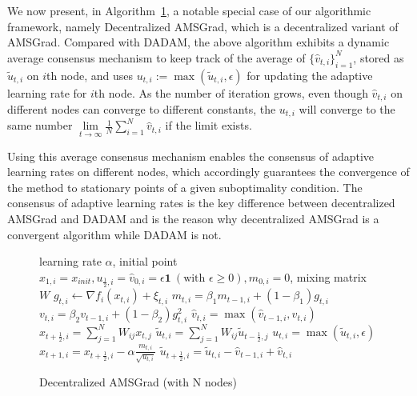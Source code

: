 \documentclass{article} %
\begin{document}
We now present, in Algorithm~\ref{alg: damsgrad}, a notable special case of our algorithmic framework, namely Decentralized AMSGrad, which is a decentralized variant of AMSGrad.
Compared with DADAM, the above algorithm exhibits a dynamic average consensus mechanism to keep track of the average of $\{\hat v_{t,i}\}_{i=1}^N$, stored as $\tilde u_{t,i}$ on $i$th node, and uses $u_{t,i} := \max(\tilde u_{t,i}, \epsilon)$ for updating the adaptive learning rate for $i$th node. 
As the number of iteration grows, even though $\hat v_{t,i}$ on different nodes can converge to different constants, the $u_{t,i}$ will converge to the same number $ \lim \limits_{t \rightarrow \infty} \frac{1}{N} \sum_{i=1}^N\hat v_{t,i} $ if the limit exists.

Using this average consensus mechanism enables the consensus of adaptive learning rates on different nodes, which accordingly guarantees the convergence of the method to stationary points of a given suboptimality condition. 
The consensus of adaptive learning rates is the key difference between decentralized AMSGrad and DADAM and is the reason why decentralized AMSGrad is a convergent algorithm while DADAM is not.\begin{figure}\vspace{-0.15in}
\begin{minipage}{\linewidth}
\begin{algorithm}[H]
	\caption{Decentralized AMSGrad (with N nodes)}
	\label{alg: damsgrad}
	\begin{algorithmic}[1]
		 learning rate $\alpha$, initial point $x_{1,i} = x_{init}, u_{\frac{1}{2},i} = \hat v_{0,i} = \epsilon \mathbf 1\ (\text{with } \epsilon \geq 0), m_{0,i}=0$, mixing matrix $W$ 
		\STATE  $g_{t,i}  \leftarrow \nabla f_i(x_{t,i}) + \xi_{t,i}$
		\STATE $m_{t,i} = \beta_1 m_{t-1,i} + (1-\beta_1) g_{t,i}$ 
		\STATE $ v_{t,i} = \beta_2 v_{t-1,i} + (1-\beta_2) g_{t,i}^2 $
		\STATE $\hat v_{t,i} = \max (\hat v_{t-1,i}, v_{t,i} )$
		\STATE $x_{t+\frac{1}{2},i} = \sum_{j=1}^N W_{ij}x_{t,j}$
		\STATE $\tilde u_{t,i} = \sum_{j=1}^N W_{ij}\tilde u_{t-\frac{1}{2},j}$
	    \STATE $u_{t,i} = \max(\tilde u_{t,i}, \epsilon)$
		\STATE $x_{t+1,i} = x_{t+\frac{1}{2},i} - \alpha \frac{m_{t,i}}{\sqrt{u_{t,i}}}$
		\STATE $\tilde u_{t+\frac{1}{2},i} = \tilde u_{t,i} - \hat v_{t-1,i} + \hat v_{t,i}$
		\ENDFAP
		\ENDFOR
	\end{algorithmic}
\end{algorithm}\vspace{-0.1in}
\end{minipage}\end{figure}
\end{document}
